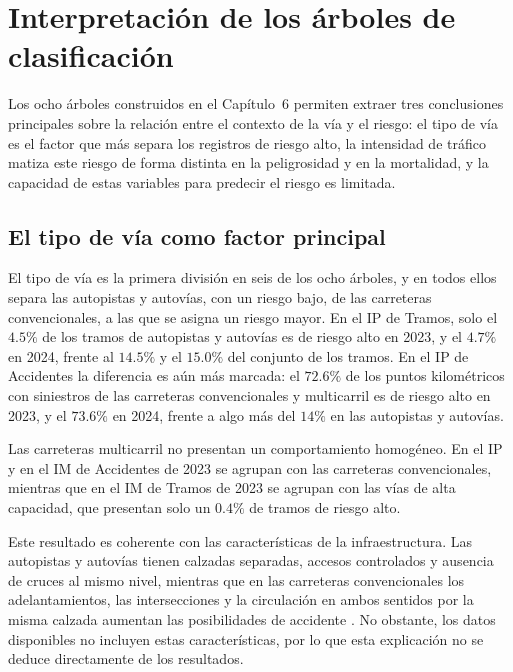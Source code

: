 \documentclass[twoside,a4paper,12pt,onecolumn,openany]{book}
\begin{document}
\section{Interpretación de los árboles de clasificación}
 
Los ocho árboles construidos en el Capítulo~6 permiten extraer tres conclusiones principales sobre la relación entre el contexto de la vía y el riesgo: el tipo de vía es el factor que más separa los registros de riesgo alto, la intensidad de tráfico matiza este riesgo de forma distinta en la peligrosidad y en la mortalidad, y la capacidad de estas variables para predecir el riesgo es limitada.
 
\subsection{El tipo de vía como factor principal}
 
El tipo de vía es la primera división en seis de los ocho árboles, y en todos ellos separa las autopistas y autovías, con un riesgo bajo, de las carreteras convencionales, a las que se asigna un riesgo mayor. En el IP de Tramos, solo el $4.5\%$ de los tramos de autopistas y autovías es de riesgo alto en 2023, y el $4.7\%$ en 2024, frente al $14.5\%$ y el $15.0\%$ del conjunto de los tramos. En el IP de Accidentes la diferencia es aún más marcada: el $72.6\%$ de los puntos kilométricos con siniestros de las carreteras convencionales y multicarril es de riesgo alto en 2023, y el $73.6\%$ en 2024, frente a algo más del $14\%$ en las autopistas y autovías.
 
\vspace{0.5cm}
 
Las carreteras multicarril no presentan un comportamiento homogéneo. En el IP y en el IM de Accidentes de 2023 se agrupan con las carreteras convencionales, mientras que en el IM de Tramos de 2023 se agrupan con las vías de alta capacidad, que presentan solo un $0.4\%$ de tramos de riesgo alto.
 
\vspace{0.5cm}
 
Este resultado es coherente con las características de la infraestructura. Las autopistas y autovías tienen calzadas separadas, accesos controlados y ausencia de cruces al mismo nivel, mientras que en las carreteras convencionales los adelantamientos, las intersecciones y la circulación en ambos sentidos por la misma calzada aumentan las posibilidades de accidente \cite{ingenieriacarreteras}. No obstante, los datos disponibles no incluyen estas características, por lo que esta explicación no se deduce directamente de los resultados.
 
\end{document}
